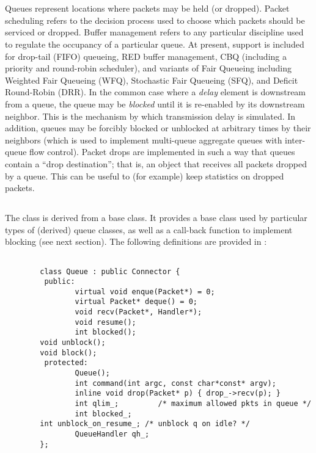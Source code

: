 %
%
\section{}

Queues represent locations where packets may be held (or dropped).
Packet scheduling refers to the decision process used to choose
which packets should be serviced or dropped.
Buffer management refers to any particular discipline used
to regulate the occupancy of a particular queue.
At present, support is included for drop-tail (FIFO) queueing,
RED buffer management, CBQ (including a priority and round-robin scheduler), and
variants of Fair Queueing including Weighted Fair Queueing (WFQ), 
Stochastic Fair Queueing (SFQ), and Deficit Round-Robin (DRR).
In the common case where a {\em delay} element is downstream from
a queue, the queue may be {\em blocked} until it is re-enabled
by its downstream neighbor.
This is the mechanism by which transmission delay is simulated.
In addition, queues may be forcibly blocked or unblocked at arbitrary
times by their neighbors (which is used to implement multi-queue
aggregate queues with inter-queue flow control).
Packet drops are implemented in such a way that queues contain
a ``drop destination''; that is, an object that receives all packets
dropped by a queue.
This can be useful to (for example) keep statistics on dropped packets.

\subsection{}

The  class is derived from a  base class.
It provides a base class used by particular types of (derived) queue classes,
as well as a call-back function to implement blocking (see next section).
The following definitions are provided in :
\begin{small}
\begin{verbatim}

        class Queue : public Connector {
         public:
                virtual void enque(Packet*) = 0;
                virtual Packet* deque() = 0;
                void recv(Packet*, Handler*);
                void resume();
                int blocked();
		void unblock();
		void block();
         protected:
                Queue();
                int command(int argc, const char*const* argv);
                inline void drop(Packet* p) { drop_->recv(p); }
                int qlim_;         /* maximum allowed pkts in queue */
                int blocked_;
		int unblock_on_resume_; /* unblock q on idle? */
                QueueHandler qh_;
        };
\end{verbatim}
\end{small}

